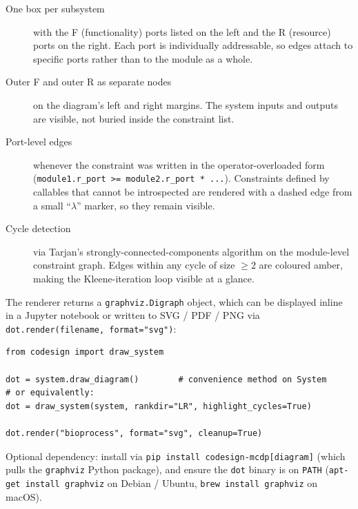 \documentclass[11pt,a4paper]{article}
\begin{document}
\begin{description}
\item[One box per subsystem] with the F (functionality) ports listed
  on the left and the R (resource) ports on the right. Each port is
  individually addressable, so edges attach to specific ports rather
  than to the module as a whole.
\item[Outer F and outer R as separate nodes] on the diagram's left
  and right margins. The system inputs and outputs are visible, not
  buried inside the constraint list.
\item[Port-level edges] whenever the constraint was written in the
  operator-overloaded form
  (\texttt{module1.r\_port >= module2.r\_port * ...}). Constraints
  defined by callables that cannot be introspected are rendered with
  a dashed edge from a small ``$\lambda$'' marker, so they remain
  visible.
\item[Cycle detection] via Tarjan's strongly-connected-components
  algorithm on the module-level constraint graph. Edges within any
  cycle of size $\geq 2$ are coloured amber, making the
  Kleene-iteration loop visible at a glance.
\end{description}

The renderer returns a \texttt{graphviz.Digraph} object, which can be
displayed inline in a Jupyter notebook or written to SVG / PDF / PNG
via \texttt{dot.render(filename, format="svg")}:

\begin{lstlisting}
from codesign import draw_system

dot = system.draw_diagram()        # convenience method on System
# or equivalently:
dot = draw_system(system, rankdir="LR", highlight_cycles=True)

dot.render("bioprocess", format="svg", cleanup=True)
\end{lstlisting}

Optional dependency: install via
\texttt{pip install codesign-mcdp[diagram]} (which pulls the
\texttt{graphviz} Python package), and ensure the \texttt{dot}
binary is on \texttt{PATH} (\texttt{apt-get install graphviz} on
Debian / Ubuntu, \texttt{brew install graphviz} on macOS).
\end{document}
